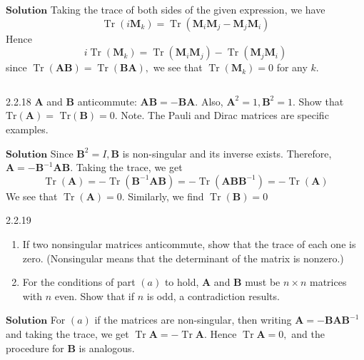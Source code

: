 $\boxed{\textbf{Solution}}$  Taking the trace of both sides of the given expression, we have
$$
\operatorname{Tr}\left(i \mathbf{M}_{k}\right)=\operatorname{Tr}\left(\mathbf{M}_{i} \mathbf{M}_{j}-\mathbf{M}_{j} \mathbf{M}_{i}\right)
$$
Hence
$$
i \operatorname{Tr}\left(\mathbf{M}_{k}\right)=\operatorname{Tr}\left(\mathbf{M}_{i} \mathbf{M}_{j}\right)-\operatorname{Tr}\left(\mathbf{M}_{j} \mathbf{M}_{i}\right)
$$
since $\operatorname{Tr}(\mathbf{A}\mathbf{B})=\operatorname{Tr}(\mathbf{B}\mathbf{A}),$ we see that $\operatorname{Tr}\left(\mathbf{M}_{k}\right)=0$ for any $k .$

$$$$

\begin{mybox}{2.2.18}
$\mathbf{A}$ and $\mathbf{B}$ anticommute: $\mathbf{A}\mathbf{B}=-\mathbf{B}\mathbf{A}$. Also, $\mathbf{A}^{2}=1, \mathbf{B}^{2}=1 .$ Show that $\text{Tr}(\mathbf{A})=$
$\text{Tr}(\mathbf{B})=0 .$
Note. The Pauli and Dirac matrices are specific examples.
\end{mybox}



$\boxed{\textbf{Solution}}$ Since $\mathbf{B}^{2}=I, \mathbf{B}$ is non-singular and its inverse exists. Therefore, $\mathbf{A}=-\mathbf{B}^{-1} \mathbf{AB}$. Taking the trace, we get
$$
\operatorname{Tr}(\mathbf{A})=-\operatorname{Tr}\left(\mathbf{B}^{-1} \mathbf{AB}\right)=-\operatorname{Tr}\left(\mathbf{ABB}^{-1}\right)=-\operatorname{Tr}(\mathbf{A})
$$
We see that $\operatorname{Tr}(\mathbf{A})=0 .$ Similarly, we find $\operatorname{Tr}(\mathbf{B})=0$


\newpage




\begin{mybox}{2.2.19}
\begin{enumerate}[$(a)$]
\item If two nonsingular matrices anticommute, show that the trace of each one is zero.
(Nonsingular means that the determinant of the matrix is nonzero.)
\item For the conditions of part $(a)$ to hold, $\mathbf{A}$ and $\mathbf{B}$ must be $n \times n$ matrices with $n$ even.
Show that if $n$ is odd, a contradiction results.
\end{enumerate}
\end{mybox}

$\boxed{\textbf{Solution}}$ For $(a)$ if the matrices are non-singular, then writing $\mathbf{A}=-\mathbf{B} \mathbf{A} \mathbf{B}^{-1}$ and taking the trace, we get $\operatorname{Tr} \mathbf{A}=-\operatorname{Tr} \mathbf{A} .$ Hence $\operatorname{Tr} \mathbf{A}=0,$ and the procedure for $\mathbf{B}$ is analogous.


